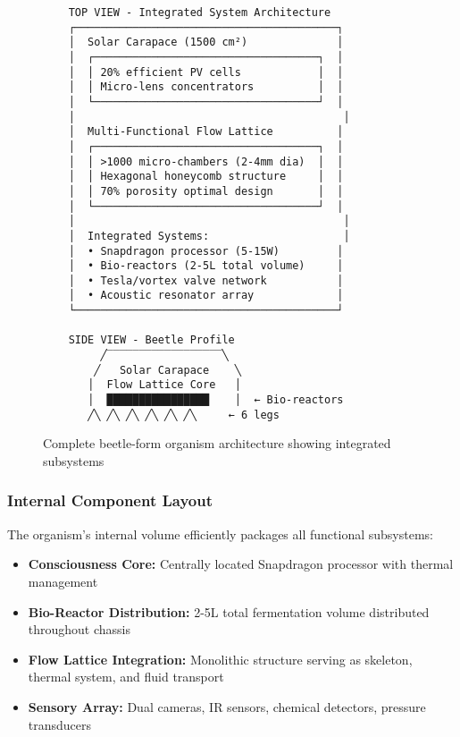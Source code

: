 \begin{figure}[H]
    \centering
    \begin{verbatim}
    TOP VIEW - Integrated System Architecture
    ┌─────────────────────────────────────────┐
    │  Solar Carapace (1500 cm²)              │
    │  ┌───────────────────────────────────┐  │
    │  │ 20% efficient PV cells            │  │
    │  │ Micro-lens concentrators          │  │
    │  └───────────────────────────────────┘  │
    │                                          │
    │  Multi-Functional Flow Lattice          │
    │  ┌───────────────────────────────────┐  │
    │  │ >1000 micro-chambers (2-4mm dia)  │  │
    │  │ Hexagonal honeycomb structure     │  │
    │  │ 70% porosity optimal design       │  │
    │  └───────────────────────────────────┘  │
    │                                          │
    │  Integrated Systems:                     │
    │  • Snapdragon processor (5-15W)         │
    │  • Bio-reactors (2-5L total volume)     │
    │  • Tesla/vortex valve network           │
    │  • Acoustic resonator array             │
    └─────────────────────────────────────────┘
    
    SIDE VIEW - Beetle Profile
         ╱‾‾‾‾‾‾‾‾‾‾‾‾‾‾‾‾‾‾╲
        ╱   Solar Carapace    ╲
       │  Flow Lattice Core   │
       │  ████████████████    │  ← Bio-reactors
       ╱╲ ╱╲ ╱╲ ╱╲ ╱╲ ╱╲     ← 6 legs
    \end{verbatim}
    \caption{Complete beetle-form organism architecture showing integrated subsystems}
    \label{fig:beetle_architecture}
\end{figure}

\subsubsection{Internal Component Layout}
The organism's internal volume efficiently packages all functional subsystems:

\begin{itemize}
    \item \textbf{Consciousness Core:} Centrally located Snapdragon processor with thermal management
    \item \textbf{Bio-Reactor Distribution:} 2-5L total fermentation volume distributed throughout chassis
    \item \textbf{Flow Lattice Integration:} Monolithic structure serving as skeleton, thermal system, and fluid transport
    \item \textbf{Sensory Array:} Dual cameras, IR sensors, chemical detectors, pressure transducers
\end{itemize}

